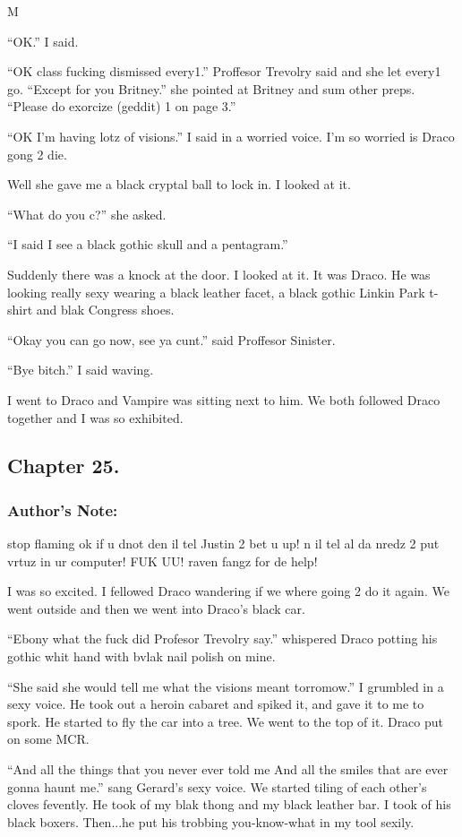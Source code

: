 M\documentclass{article}
\begin{document}
“OK.” I said.

“OK class fucking dismissed every1.” Proffesor Trevolry said and she let every1 go. “Except for you Britney.” she pointed at Britney and sum other preps. “Please do exorcize (geddit) 1 on page 3.”

“OK I’m having lotz of visions.” I said in a worried voice. I’m so worried is Draco gong 2 die.

Well she gave me a black cryptal ball to lock in. I looked at it.

“What do you c?” she asked.

“I said I see a black gothic skull and a pentagram.”

Suddenly there was a knock at the door. I looked at it. It was Draco. He was looking really sexy wearing a black leather facet, a black gothic Linkin Park t-shirt and blak Congress shoes.

“Okay you can go now, see ya cunt.” said Proffesor Sinister.

“Bye bitch.” I said waving.

I went to Draco and Vampire was sitting next to him. We both followed Draco together and I was so exhibited.

\clearpage\nolinenumbers
\subsection*{Chapter 25.}

\subsubsection*{Author's Note: }stop flaming ok if u dnot den il tel Justin 2 bet u up! n il tel al da nredz 2 put vrtuz in ur computer! FUK UU! raven fangz for de help!

\textbreak
\linenumbers\resetlinenumber

I was so excited. I fellowed Draco wandering if we where going 2 do it again. We went outside and then we went into Draco’s black car.

“Ebony what the fuck did Profesor Trevolry say.” whispered Draco potting his gothic whit hand with bvlak nail polish on mine.

“She said she would tell me what the visions meant torromow.” I grumbled in a sexy voice. He took out a heroin cabaret and spiked it, and gave it to me to spork. He started to fly the car into a tree. We went to the top of it. Draco put on some MCR.

“And all the things that you never ever told me
And all the smiles that are ever gonna haunt me.” sang Gerard’s sexy voice. We started tiling of each other’s cloves fevently. He took of my blak thong and my black leather bar. I took of his black boxers. Then...he put his trobbing you-know-what in my tool sexily.
\end{document}
